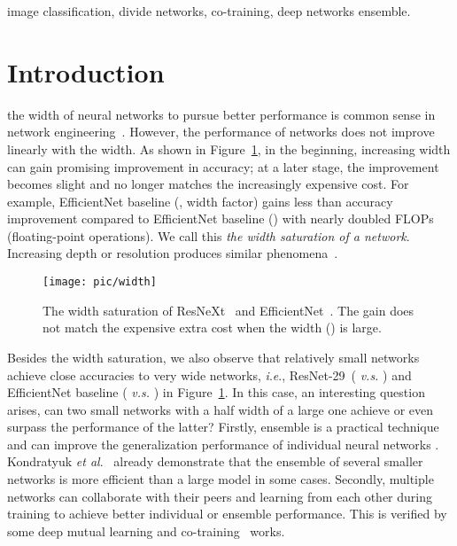 \documentclass[lettersize,journal]{IEEEtran}
\newcommand{\etal}{\textit{et al}.}
\newcommand{\ie}{\textit{i}.\textit{e}.}
\begin{document}
\begin{IEEEkeywords}
image classification, divide networks, co-training, deep networks ensemble.
\end{IEEEkeywords}

\section{Introduction} \label{sec_intro}
 the width of neural networks to pursue better performance
is common sense in network engineering~\cite{2019_EfficientNet,2016_WRN, 2017_ResNeXt}.
However, the performance of networks does not improve linearly with the width.
As shown in Figure~\ref{fig_width_acc}, 
in the beginning, increasing width can gain promising improvement in accuracy;
at a later stage, the improvement becomes
slight and no longer matches the increasingly expensive cost.
For example, EfficientNet baseline (, width factor) gains less than
 accuracy improvement compared to EfficientNet baseline () with nearly doubled 
FLOPs (floating-point operations).
We call this \emph{the width saturation of a network}. 
Increasing depth or resolution produces similar phenomena~\cite{2019_EfficientNet}.

\begin{figure}[tbp]
	\centering
	\texttt{[image: pic/width]}
	\caption{The width saturation of ResNeXt~\cite{2017_ResNeXt}
		and EfficientNet~\cite{2019_EfficientNet}.
		The gain does not match the expensive extra cost when the width () is large.
	}
	\label{fig_width_acc}
\end{figure}

Besides the width saturation,
we also observe that relatively small networks achieve close accuracies
to very wide networks, \ie, ResNet-29~( \textit{v.s.} )
and EfficientNet baseline ( \textit{v.s.} ) in Figure~\ref{fig_width_acc}.
In this case, an interesting question arises,
can two small networks with a half width of a large one
achieve or even surpass the performance of the latter?
Firstly, ensemble is a practical technique and can improve
the generalization performance of individual neural networks
\cite{HuangLP0HW17, LiWD18, LiuY99, ROSEN96, abs-1904-05488}.    
Kondratyuk \etal~\cite{kondratyukWhenEnsemblingSmaller2020}
already demonstrate that the ensemble of several smaller networks is
more efficient than a large model in some cases.
Secondly, multiple networks can collaborate with their peers and
learning from each other during
training to achieve better individual or ensemble performance. 
This is verified by some deep mutual learning
\cite{2020_ICLR_MMT,yang2020mutualnet,2018_CVPR_DML}
and co-training~\cite{2018_QiaoSZWY18} works.
\end{document}
